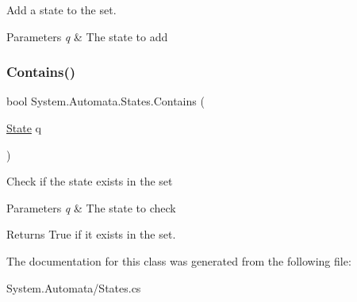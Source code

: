 Add a state to the set. 


\begin{DoxyParams}{Parameters}
{\em q} & The state to add\\
\hline
\end{DoxyParams}
\mbox{\label{class_system_1_1_automata_1_1_states_abf65a1d2a45b018f3f0a8db86a8f8129}} 
\subsubsection{\texorpdfstring{Contains()}{Contains()}}
{\footnotesize\ttfamily bool System.\+Automata.\+States.\+Contains (\begin{DoxyParamCaption}\item[{\mbox{\hyperlink{class_system_1_1_automata_1_1_state}{State}}}]{q }\end{DoxyParamCaption})}



Check if the state exists in the set 


\begin{DoxyParams}{Parameters}
{\em q} & The state to check\\
\hline
\end{DoxyParams}
\begin{DoxyReturn}{Returns}
True if it exists in the set.
\end{DoxyReturn}


The documentation for this class was generated from the following file\+:\begin{DoxyCompactItemize}
\item 
System.\+Automata/States.\+cs\end{DoxyCompactItemize}
